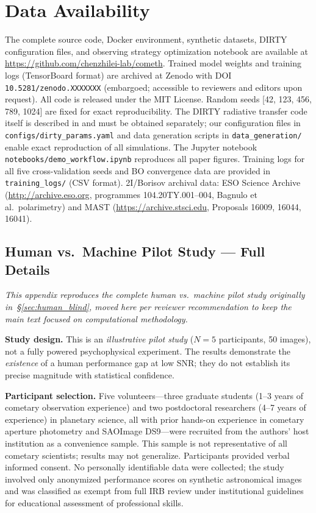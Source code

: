 \documentclass[usenatbib]{mnras}
\begin{document}
\section*{Data Availability}
The complete source code, Docker environment, synthetic datasets, DIRTY configuration files, and observing strategy optimization notebook are available at \url{https://github.com/chenzhilei-lab/cometh}. Trained model weights and training logs (TensorBoard format) are archived at Zenodo with DOI \texttt{10.5281/zenodo.XXXXXXX} (embargoed; accessible to reviewers and editors upon request). All code is released under the MIT License. Random seeds [42, 123, 456, 789, 1024] are fixed for exact reproducibility. The DIRTY radiative transfer code itself is described in \citet{gordon01} and must be obtained separately; our configuration files in {\tt configs/dirty\_params.yaml} and data generation scripts in {\tt data\_generation/} enable exact reproduction of all simulations. The Jupyter notebook {\tt notebooks/demo\_workflow.ipynb} reproduces all paper figures. Training logs for all five cross-validation seeds and BO convergence data are provided in {\tt training\_logs/} (CSV format). 2I/Borisov archival data: ESO Science Archive (\url{http://archive.eso.org}, programmes 104.20TY.001--004, Bagnulo et al.\ polarimetry) and MAST (\url{https://archive.stsci.edu}, Proposals 16009, 16044, 16041).




\subsection{Human vs.\ Machine Pilot Study --- Full Details}\label{app:human_blind}

\textit{This appendix reproduces the complete human vs.\ machine pilot study originally in~\S\ref{sec:human_blind}, moved here per reviewer recommendation to keep the main text focused on computational methodology.}

\textbf{Study design.} This is an \textit{illustrative pilot study} ($N=5$ participants, 50 images), not a fully powered psychophysical experiment. The results demonstrate the \textit{existence} of a human performance gap at low SNR; they do not establish its precise magnitude with statistical confidence.

\textbf{Participant selection.} Five volunteers---three graduate students (1--3 years of cometary observation experience) and two postdoctoral researchers (4--7 years of experience) in planetary science, all with prior hands-on experience in cometary aperture photometry and SAOImage DS9---were recruited from the authors' host institution as a convenience sample. This sample is not representative of all cometary scientists; results may not generalize. Participants provided verbal informed consent. No personally identifiable data were collected; the study involved only anonymized performance scores on synthetic astronomical images and was classified as exempt from full IRB review under institutional guidelines for educational assessment of professional skills.
\end{document}

